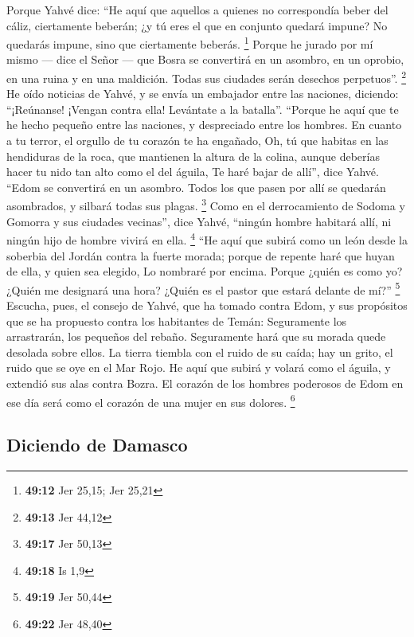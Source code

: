 \begin{paracol}{2}
 Porque Yahvé dice: ``He aquí que aquellos a quienes no
correspondía beber del cáliz, ciertamente beberán; ¿y tú eres el que en
conjunto quedará impune? No quedarás impune, sino que ciertamente
beberás. \footnote{\textbf{49:12} Jer 25,15; Jer 25,21} 
Porque he jurado por mí mismo --- dice el Señor --- que Bosra se
convertirá en un asombro, en un oprobio, en una ruina y en una
maldición. Todas sus ciudades serán desechos perpetuos''. \footnote{\textbf{49:13}
  Jer 44,12}  He oído noticias de Yahvé, y se envía un
embajador entre las naciones, diciendo: ``¡Reúnanse! ¡Vengan contra
ella! Levántate a la batalla''.  ``Porque he aquí que te
he hecho pequeño entre las naciones, y despreciado entre los hombres.
 En cuanto a tu terror, el orgullo de tu corazón te ha
engañado, Oh, tú que habitas en las hendiduras de la roca, que mantienen
la altura de la colina, aunque deberías hacer tu nido tan alto como el
del águila, Te haré bajar de allí'', dice Yahvé.  ``Edom
se convertirá en un asombro. Todos los que pasen por allí se quedarán
asombrados, y silbará todas sus plagas. \footnote{\textbf{49:17} Jer
  50,13}  Como en el derrocamiento de Sodoma y Gomorra y
sus ciudades vecinas'', dice Yahvé, ``ningún hombre habitará allí, ni
ningún hijo de hombre vivirá en ella. \footnote{\textbf{49:18} Is 1,9}
 ``He aquí que subirá como un león desde la soberbia del
Jordán contra la fuerte morada; porque de repente haré que huyan de
ella, y quien sea elegido, Lo nombraré por encima. Porque ¿quién es como
yo? ¿Quién me designará una hora? ¿Quién es el pastor que estará delante
de mí?'' \footnote{\textbf{49:19} Jer 50,44}  Escucha,
pues, el consejo de Yahvé, que ha tomado contra Edom, y sus propósitos
que se ha propuesto contra los habitantes de Temán: Seguramente los
arrastrarán, los pequeños del rebaño. Seguramente hará que su morada
quede desolada sobre ellos.  La tierra tiembla con el
ruido de su caída; hay un grito, el ruido que se oye en el Mar Rojo.
 He aquí que subirá y volará como el águila, y extendió
sus alas contra Bozra. El corazón de los hombres poderosos de Edom en
ese día será como el corazón de una mujer en sus dolores. \footnote{\textbf{49:22}
  Jer 48,40}

\hypertarget{diciendo-de-damasco}{%
\subsection{Diciendo de Damasco}\label{diciendo-de-damasco}}


\end{paracol}
